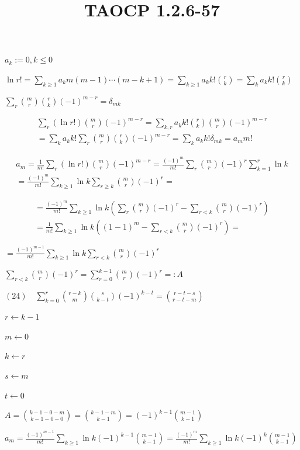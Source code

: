 \documentclass{article}
\title{TAOCP 1.2.6\mbox{-}57}
\begin{document}
\maketitle

\( a_{k} := 0, k \leq 0 \)

\( \ln r! = \sum_{k \geq 1} a_{k} m(m-1)\cdots(m-k+1) = \sum_{k \geq 1} a_{k} k! \binom{r}{k} = \sum_{k} a_{k} k! \binom{r}{k} \)

\( \sum_{r} \binom{m}{r}\binom{r}{k}{(-1)}^{m-r} = \delta_{mk} \)

\begin{multline*}
\sum_{r} (\ln r!)\binom{m}{r}{(-1)}^{m-r} = \sum_{k,r} a_{k}k! \binom{r}{k}\binom{m}{r}{(-1)}^{m-r} \\
= \sum_{k} a_{k} k! \sum_{r} \binom{m}{r}\binom{r}{k}{(-1)}^{m-r} = \sum_{k} a_{k} k! \delta_{mk} = a_{m} m!
\end{multline*}

\begin{multline*}
a_{m} = \frac{1}{m!} \sum_{r} (\ln r!)\binom{m}{r}{(-1)}^{m-r} = \frac{{(-1)}^{m}}{m!} \sum_{r} \binom{m}{r}{(-1)}^{r} \sum_{k = 1}^{r} \ln k \\
= \frac{{(-1)}^{m}}{m!} \sum_{k \geq 1} \ln k \sum_{r \geq k} \binom{m}{r}{(-1)}^{r} =
\end{multline*}

\begin{multline*}
= \frac{{(-1)}^{m}}{m!} \sum_{k \geq 1} \ln k (\sum_{r} \binom{m}{r}{(-1)}^{r} - \sum_{r < k} \binom{m}{r}{(-1)}^{r}) \\
= \frac{1}{m!} \sum_{k \geq 1} \ln k ({(1-1)}^{m} - \sum_{r < k} \binom{m}{r}{(-1)}^{r}) =
\end{multline*}

\( = \frac{{(-1)}^{m-1}}{m!} \sum_{k \geq 1} \ln k \sum_{r < k} \binom{m}{r}{(-1)}^{r} \)

\( \sum_{r < k} \binom{m}{r}{(-1)}^{r} = \sum_{r=0}^{k-1} \binom{m}{r}{(-1)}^{r} =: A \)

\( (24) \quad \sum_{k=0}^{r} \binom{r-k}{m}\binom{s}{k-t} {(-1)}^{k-t} = \binom{r-t-s}{r-t-m} \)

\( r \leftarrow k-1 \)

\( m \leftarrow 0 \)

\( k \leftarrow r \)

\( s \leftarrow m \)

\( t \leftarrow 0 \)

\( A = \binom{k-1-0-m}{k-1-0-0} = \binom{k-1-m}{k-1} = {(-1)}^{k-1} \binom{m-1}{k-1} \)

\( a_{m} = \frac{{(-1)}^{m-1}}{m!} \sum_{k \geq 1} \ln k {(-1)}^{k-1} \binom{m-1}{k-1} = \frac{{(-1)}^{m}}{m!} \sum_{k \geq 1} \ln k {(-1)}^{k} \binom{m-1}{k-1} \)
\end{document}
